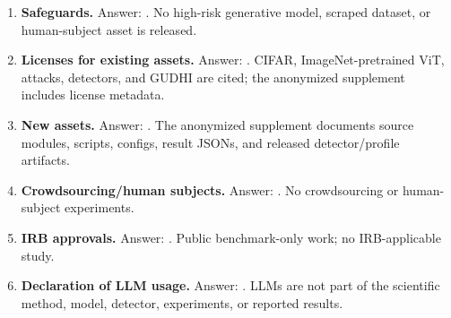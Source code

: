 \begin{enumerate}[leftmargin=*]
\item \textbf{Safeguards.} Answer: \answerNA{}. No high-risk generative model, scraped dataset, or human-subject asset is released.
\item \textbf{Licenses for existing assets.} Answer: \answerYes{}. CIFAR, ImageNet-pretrained ViT, attacks, detectors, and GUDHI are cited; the anonymized supplement includes license metadata.
\item \textbf{New assets.} Answer: \answerYes{}. The anonymized supplement documents source modules, scripts, configs, result JSONs, and released detector/profile artifacts.
\item \textbf{Crowdsourcing/human subjects.} Answer: \answerNA{}. No crowdsourcing or human-subject experiments.
\item \textbf{IRB approvals.} Answer: \answerNA{}. Public benchmark-only work; no IRB-applicable study.
\item \textbf{Declaration of LLM usage.} Answer: \answerNA{}. LLMs are not part of the scientific method, model, detector, experiments, or reported results.
\end{enumerate}
